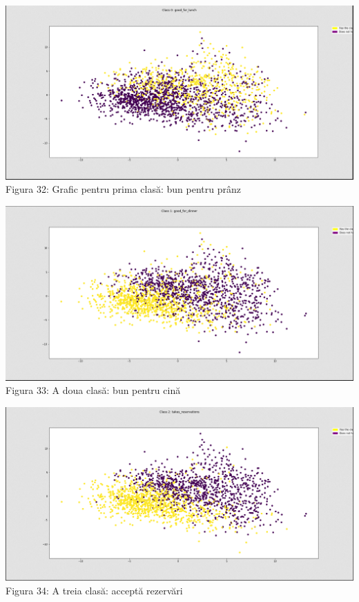 \begin{center}
\includegraphics[scale=0.4]{class0} \\
Figura 32: Grafic pentru prima clasă: bun pentru prânz \\
\hfill \break

\includegraphics[scale=0.4]{class1} \\
Figura 33: A doua clasă: bun pentru cină \\
\hfill \break

\includegraphics[scale=0.4]{class2} \\ 
Figura 34: A treia clasă: acceptă rezervări \\ 
\hfill \break


\end{center}
